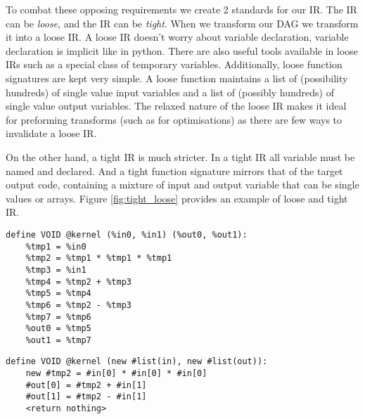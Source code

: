 To combat these opposing requirements we create 2 standards for our IR.
The IR can be \textit{loose}, and the IR can be \textit{tight}.
When we transform our DAG we transform it into a loose IR.
A loose IR doesn't worry about variable declaration, variable declaration is implicit like in python.
There are also useful tools available in loose IRs such as a special class of temporary variables.
Additionally, loose function signatures are kept very simple.
A loose function maintains a list of (possibility hundreds) of single value input variables and a list of (possibly hundreds) of single value output variables.
The relaxed nature of the loose IR makes it ideal for preforming transforms (such as for optimisations) as there are few ways to invalidate a loose IR.

On the other hand, a tight IR is much stricter.
In a tight IR all variable must be named and declared.
And a tight function signature mirrors that of the target output code, containing a mixture of input and output variable that can be single values or arrays.
Figure \ref{fig:tight_loose} provides an example of loose and tight IR. 

\newsavebox{\looseIRlisting}
\begin{lrbox}{\looseIRlisting}%
\begin{lstlisting}
define VOID @kernel (%in0, %in1) (%out0, %out1):
	%tmp1 = %in0
	%tmp2 = %tmp1 * %tmp1 * %tmp1
	%tmp3 = %in1
	%tmp4 = %tmp2 + %tmp3
	%tmp5 = %tmp4
	%tmp6 = %tmp2 - %tmp3
	%tmp7 = %tmp6
	%out0 = %tmp5
	%out1 = %tmp7
\end{lstlisting}
\endminipage
\end{lrbox}

\newsavebox{\tightIRlisting}
\begin{lrbox}{\tightIRlisting}%
\begin{lstlisting}
define VOID @kernel (new #list(in), new #list(out)):
	new #tmp2 = #in[0] * #in[0] * #in[0]
	#out[0] = #tmp2 + #in[1]
	#out[1] = #tmp2 - #in[1]
	<return nothing>
\end{lstlisting}
\endminipage
\end{lrbox}

